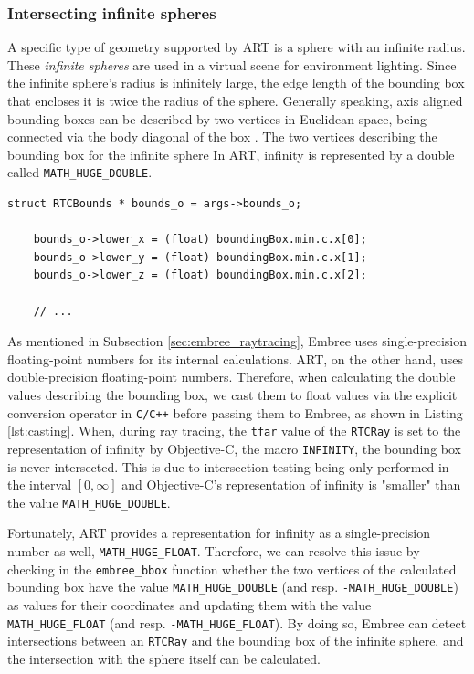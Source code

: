 \subsubsection{Intersecting infinite spheres}

A specific type of geometry supported by ART is a sphere with an infinite radius. These \emph{infinite spheres} are used in a virtual scene for environment lighting.
Since the infinite sphere's radius is infinitely large, the edge length of the bounding box that encloses it is twice the radius of the sphere. Generally speaking, axis aligned bounding boxes can be described by two vertices in Euclidean space, being connected via the body diagonal of the box . The two vertices describing the bounding box for the infinite sphere  In ART, infinity is represented by a double called \texttt{MATH\_HUGE\_DOUBLE}.

\begin{listing} 
	\begin{lstlisting}[caption={Casting of a double precision floating point number to a single precision floating point number by explicit conversion.}, label={lst:casting}]
	struct RTCBounds * bounds_o = args->bounds_o;
	
	bounds_o->lower_x = (float) boundingBox.min.c.x[0];
	bounds_o->lower_y = (float) boundingBox.min.c.x[1];
	bounds_o->lower_z = (float) boundingBox.min.c.x[2];
	
	// ...
	\end{lstlisting}
\end{listing}

As mentioned in Subsection \ref{sec:embree_raytracing}, Embree uses single-precision floating-point numbers for its internal calculations. ART, on the other hand, uses double-precision floating-point numbers. Therefore, when calculating the double values describing the bounding box, we cast them to float values via the explicit conversion operator in \texttt{C/C++} before passing them to Embree, as shown in Listing \ref{lst:casting}.  
When, during ray tracing, the \texttt{tfar} value of the \texttt{RTCRay} is set to the representation of infinity by Objective-C, the macro \texttt{INFINITY}, the bounding box is never intersected. This is due to intersection testing being only performed in the interval $[0,\infty]$ and Objective-C's representation of infinity is "smaller" than the value \texttt{MATH\_HUGE\_DOUBLE}.

Fortunately, ART provides a representation for infinity as a single-precision number as well, \texttt{MATH\_HUGE\_FLOAT}. Therefore, we can resolve this issue by checking in the \texttt{embree\_bbox} function whether the two vertices of the calculated bounding box have the value \texttt{MATH\_HUGE\_DOUBLE} (and resp. \texttt{-MATH\_HUGE\_DOUBLE}) as values for their coordinates and updating them with the value \texttt{MATH\_HUGE\_FLOAT} (and resp. \texttt{-MATH\_HUGE\_FLOAT}). By doing so, Embree can detect intersections between an \texttt{RTCRay} and the bounding box of the infinite sphere, and the intersection with the sphere itself can be calculated.

